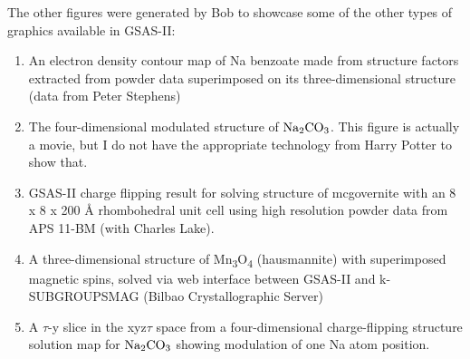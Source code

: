 \noindent The other figures were generated by Bob to showcase some of the other types of graphics available in GSAS-II:

\renewcommand{\theenumi}{\Alph{enumi}}
\renewcommand{\labelenumi}{\theenumi.}
\begin{enumerate}

    \item 
An electron density contour map of Na benzoate made from structure factors extracted from powder data superimposed on its three-dimensional structure (data from Peter Stephens)

    \item 
The four-dimensional modulated structure of $\rm Na_2CO_3$. This figure is actually a movie, but I do not have the appropriate technology from Harry Potter to show that. 

    \item 
GSAS-II charge flipping result for solving structure of mcgovernite with an 8 x 8 x 200 Å rhombohedral unit cell using high resolution powder data from APS 11-BM (with Charles Lake).

    \item 
A three-dimensional structure of Mn\textsubscript{3}O\textsubscript{4} (hausmannite) with superimposed magnetic spins, solved via web interface between GSAS-II and k-SUBGROUPSMAG (Bilbao Crystallographic Server)

    \item 
A $\tau$-y slice in the xyz$\tau$ space from a four-dimensional charge-flipping structure solution map for $\rm Na_2CO_3$ showing modulation of one Na atom position.
\end{enumerate}
